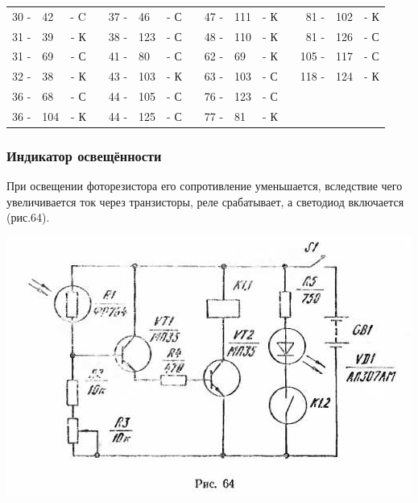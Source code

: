 \documentclass[12pt]{article}
\begin{document}
\vspace{5cm}

\hrulefill

\begin{tabular}{r l r p{0.5cm} r l r p{0.5cm} r l r p{0.5cm} r l r}
30 - &  42 & - C &   & 37 - &  46 & - С &   &  47 - & 111 & - К &   &  81 - & 102  & - К\\
31 - &  39 & - К &   & 38 - & 123 & - С &   &  48 - & 110 & - К &   &  81 - & 126  & - С\\
31 - &  69 & - С &   & 41 - &  80 & - С &   &  62 - &  69 & - К &   & 105 - & 117  & - С\\
32 - &  38 & - К &   & 43 - & 103 & - К &   &  63 - & 103 & - С &   & 118 - & 124  & - К\\
36 - &  68 & - С &   & 44 - & 105 & - С &   &  76 - & 123 & - С &   &       &      &    \\
36 - & 104 & - К &   & 44 - & 125 & - С &   &  77 - &  81 & - К &   &       &      &    \\
\end{tabular}

\hrulefill

\newpage

\subsubsection{Индикатор освещённости}

При освещении фоторезистора его сопротивление уменьшается, вследствие чего увеличивается ток через транзисторы, реле срабатывает, а светодиод включается (рис.64).

\includegraphics[scale=1, angle=0]{ekon3_064_1}

\vspace{6cm}
\end{document}

